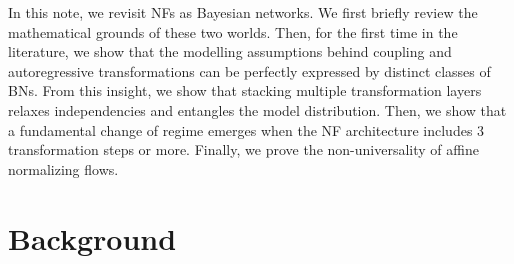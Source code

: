 In this note, we revisit NFs as Bayesian networks.
We first briefly review the mathematical grounds of these two worlds. Then, for the first time in the literature, we show that the modelling assumptions behind coupling and autoregressive transformations can be perfectly expressed by distinct classes of BNs.
From this insight, we show that stacking multiple transformation layers relaxes independencies and entangles the model distribution.
Then, we show that a fundamental change of regime emerges when the NF architecture includes 3 transformation steps or more.
Finally, we prove the non-universality of affine normalizing flows.


\section{Background}
